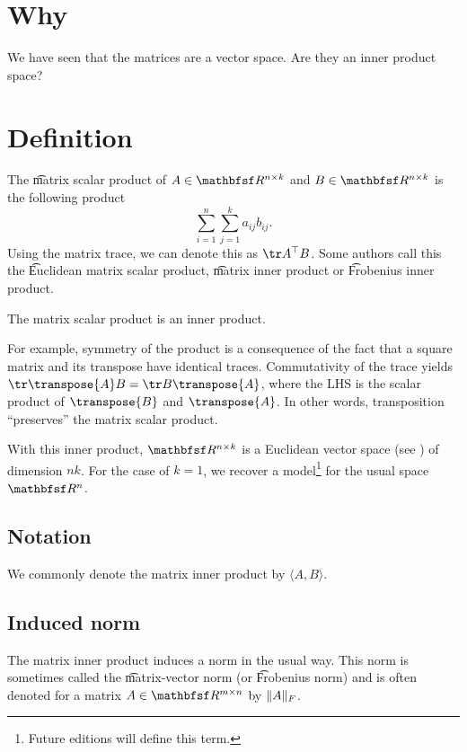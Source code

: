 

\section*{Why}

We have seen that the matrices are a vector space.
Are they an inner product space?

\section*{Definition}

The \t{matrix scalar product} of $A \in \R ^{n \times k}$ and $B \in \R ^{n \times k}$ is the following product
\[
\sum_{i = 1}^{n} \sum_{j = 1}^{k} a_{ij}b_{ij}.
\]
Using the matrix trace, we can denote this as $\tr A^\top  B$.
Some authors call this the \t{Euclidean matrix scalar product}, \t{matrix inner product} or \t{Frobenius inner product}.

\begin{proposition}
The matrix scalar product is an inner product.
\end{proposition}


For example, symmetry of the product is a consequence of the fact that a square matrix and its transpose have identical traces.
Commutativity of the trace yields $\tr \transpose{A} B = \tr B\transpose{A}$, where the LHS is the scalar product of $\transpose{B}$ and $\transpose{A}$.
In other words, transposition ``preserves'' the matrix scalar product.

With this inner product, $\R ^{n \times k}$ is a Euclidean vector space (see ) of dimension $nk$.
For the case of $k = 1$, we recover a model\footnote{Future editions will define this term.}
for the usual space $\R ^n$.

\subsection*{Notation}

We commonly denote the matrix inner product by $\langle A, B \rangle$.

\subsection*{Induced norm}

The matrix inner product induces a norm in the usual way.
This norm is sometimes called the \t{matrix-vector norm} (or \t{Frobenius norm}) and is often denoted for a matrix $A \in \R ^{m \times  n}$ by $\lVert A\rVert_F$.
